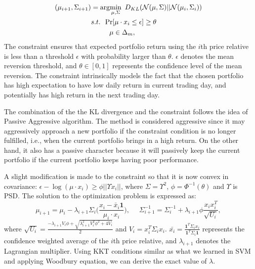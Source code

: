 \begin{equation}
\begin{split}
(\mu_{i+1}, \Sigma_{i+1}) &=\arg\!\min_{\mu,\Sigma}~D_{KL}(\mathcal{N}(\mu,\Sigma) || \mathcal{N}(\mu_i,\Sigma_i))\\
& s.t.~ ~\textrm{Pr}[\mu\cdot x_i \le \epsilon] \ge \theta\\
& ~~~~~~~~\mu \in \Delta_m,
\label{eq:orginalOPT}
\end{split}
\end{equation}
The constraint ensures that expected portfolio return using the $i$th price relative is less than a threshold $\epsilon$ with probability larger than $\theta$. $\epsilon$ denotes the mean reversion threshold, and $\theta \in [0,1]$ represents the confidence level of the mean reversion. The constraint intrinsically models the fact that the chosen portfolio has high expectation to have low daily return in current trading day, and potentially has high return in the next trading day.

The combination of the the KL divergence and the constraint follows the idea of Passive Aggressive algorithm\cite{Crammer:2006:OPA:1248547.1248566}. The method is considered aggressive since it may aggressively approach a new portfolio if the constraint condition is no longer fulfilled, i.e., when the current portfolio brings in a high return. On the other hand, it also has a passive character because it will passively keep the current portfolio if the current portfolio keeps having poor performance.

A slight modification is made to the constraint so that it is now convex in covariance: $\epsilon - \log(\mu\cdot x_i) \ge \phi||\Upsilon x_i||$,
where $\Sigma = \Upsilon^2$, $\phi = \Phi^{-1}(\theta)$ and $\Upsilon$ is PSD. The solution to the optimization problem is expressed as:
\begin{equation}
\mu_{i+1} = \mu_{i} - \lambda_{i+1}\Sigma_i\bigg(\frac{x_i-\bar{x}_i\textbf{1}}{\mu_i\cdot x_i}\bigg), ~~~~~~\Sigma_{i+1}^{-1} = \Sigma_i^{-1} + \lambda_{i+1}\phi \frac{x_ix_i^T}{\sqrt{U_i}},
\label{eq:CWMR_update}
\end{equation}
 where $\sqrt{U_i} = \frac{-\lambda_{i+1} V_i\phi+ \sqrt{\lambda_{i+1}^2V_i^2\phi^2 +4V_i} }{2}$ and $V_i = x_i^T\Sigma_ix_i$. $\bar{x_i} = \frac{\textbf{1}^T \Sigma_i x_i}{\textbf{1}^T\Sigma_i \textbf{1}}$ represents the confidence weighted average of the $i$th price relative, and  $\lambda_{i+1}$ denotes the Lagrangian multiplier. Using KKT conditions similar as what we learned in SVM and applying Woodbury equation, we can derive the exact value of $\lambda$.
  
